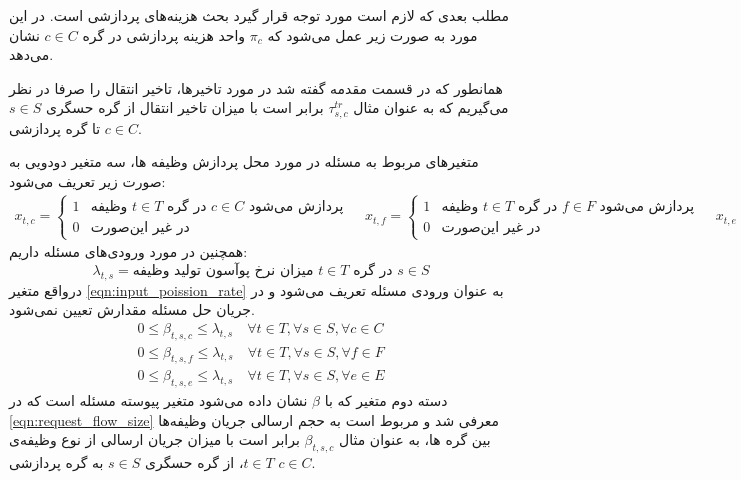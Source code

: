 	مطلب بعدی که لازم است مورد توجه قرار گیرد بحث هزینه‌های پردازشی است. در این مورد به صورت زیر عمل می‌شود که $\pi_c$ واحد هزینه پردازشی در گره $c \in C$ نشان می‌دهد. 
	
	همانطور که در قسمت مقدمه گفته شد در مورد تاخیرها، تاخیر انتقال را صرفا در نظر می‌گیریم که به عنوان مثال $\tau_{s,c}^{tr}$ برابر است با میزان تاخیر انتقال از گره حسگری $s \in S$ تا گره پردازشی $c \in C$. 
	
	متغیرهای مربوط به مسئله
	در مورد محل پردازش وظیفه ها، سه متغیر دودویی به صورت زیر تعریف می‌شود:
	    \begin{subequations}
		\begin{align}
		x_{t,c} =
		\begin{cases}
		1 & \text{وظیفه $t \in T$ در گره $c \in C$ پردازش می‌شود } \\
		0 & \text{در غیر این‌صورت}
		\end{cases}
		\end{align}
		
		\begin{align}
		x_{t,f} =
		\begin{cases}
		1 & \text{وظیفه $t \in T$ در گره $f \in F$ پردازش می‌شود } \\
		0 & \text{در غیر این‌صورت}
		\end{cases}
		\end{align}
		
		\begin{align}
		x_{t,e} =
		\begin{cases}
		1 & \text{وظیفه $t \in T$ در گره $e \in E$ پردازش می‌شود } \\
		0 & \text{در غیر این‌صورت}
		\end{cases}
		\end{align}
	\end{subequations}
	همچنین در مورد ورودی‌های مسئله داریم:
	\begin{equation}\label{eqn:input_poission_rate}
		\lambda_{t,s} = \text{میزان نرخ پوآسون تولید وظیفه $t \in T$ در گره $s \in S$}
	\end{equation}
درواقع متغیر \cref{eqn:input_poission_rate} به عنوان ورودی مسئله تعریف می‌شود و در جریان حل مسئله مقدارش تعیین نمی‌شود. 
	\begin{subequations}\label{eqn:request_flow_size}
		\begin{align}
		0 \le \beta_{t,s,c} \le \lambda_{t,s}  \quad \forall{t \in T}, \forall{s \in S}, \forall{c \in C} \\
		0 \le \beta_{t,s,f} \le \lambda_{t,s}  \quad \forall{t \in T}, \forall{s \in S}, \forall{f \in F} \\
		0 \le \beta_{t,s,e} \le \lambda_{t,s}  \quad \forall{t \in T}, \forall{s \in S}, \forall{e \in E}
		\end{align}
	\end{subequations}
	دسته دوم متغیر که با $\beta$ نشان داده می‌شود متغیر پیوسته مسئله است که در \cref{eqn:request_flow_size} معرفی شد و مربوط است به حجم ارسالی جریان وظیفه‌ها بین گره ها، به عنوان مثال $\beta_{t,s,c}$ برابر است با میزان جریان ارسالی از نوع وظیفه‌ی $t \in T$، از گره حسگری $s \in S$ به گره پردازشی $c \in C$. 
	
